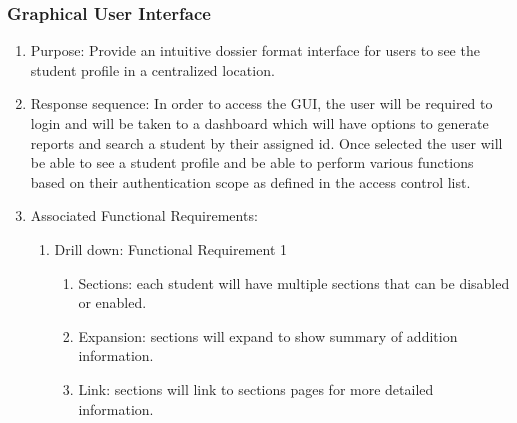 \documentclass{journal}
\begin{document}
				\subsubsection{Graphical User Interface}
				\begin{enumerate}
				\item Purpose: Provide an intuitive dossier format interface for users to see the student profile in a centralized location.
				\item Response sequence: In order to access the GUI, the user will be required to login and will be taken to a dashboard which will have options to generate reports and search a student by their assigned id. Once selected the user will be able to see a student profile and be able to perform various functions based on their authentication scope as defined in the access control list.
				\item Associated Functional Requirements:
				\begin{enumerate}
				\item Drill down: Functional Requirement 1
				\begin{enumerate}
				\item Sections: each student will have multiple sections that can be disabled or enabled.
				\item Expansion: sections will expand to show summary of addition information.
				\item Link: sections will link to sections pages for more detailed information.
				\end{enumerate}
				\end{enumerate}
				\end{enumerate}
\end{document}
